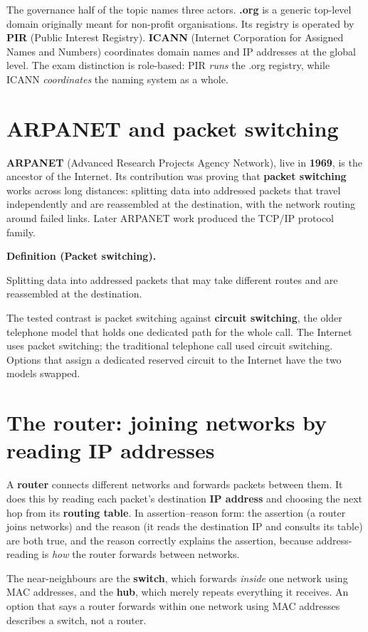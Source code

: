 \documentclass[11pt]{article}
\newenvironment{definitionbox}[1]{%
  \par\noindent\textbf{Definition (#1).}\ \itshape
}{\par\vspace{0.3em}}
\begin{document}
The governance half of the topic names three actors. \textbf{.org} is a
generic top-level domain originally meant for non-profit organisations.
Its registry is operated by \textbf{PIR} (Public Interest Registry).
\textbf{ICANN} (Internet Corporation for Assigned Names and Numbers)
coordinates domain names and IP addresses at the global level. The exam
distinction is role-based: PIR \emph{runs} the .org registry, while ICANN
\emph{coordinates} the naming system as a whole.

\section{ARPANET and packet switching}
\textbf{ARPANET} (Advanced Research Projects Agency Network), live in
\textbf{1969}, is the ancestor of the Internet. Its contribution was proving
that \textbf{packet switching} works across long distances: splitting data
into addressed packets that travel independently and are reassembled at the
destination, with the network routing around failed links. Later ARPANET work
produced the TCP/IP protocol family.

\begin{definitionbox}{Packet switching}
Splitting data into addressed packets that may take different routes and are
reassembled at the destination.
\end{definitionbox}

The tested contrast is packet switching against \textbf{circuit switching},
the older telephone model that holds one dedicated path for the whole call.
The Internet uses packet switching; the traditional telephone call used
circuit switching. Options that assign a dedicated reserved circuit to the
Internet have the two models swapped.

\section{The router: joining networks by reading IP addresses}
A \textbf{router} connects different networks and forwards packets between
them. It does this by reading each packet's destination \textbf{IP address}
and choosing the next hop from its \textbf{routing table}. In
assertion--reason form: the assertion (a router joins networks) and the
reason (it reads the destination IP and consults its table) are both true,
and the reason correctly explains the assertion, because address-reading is
\emph{how} the router forwards between networks.

The near-neighbours are the \textbf{switch}, which forwards \emph{inside} one
network using MAC addresses, and the \textbf{hub}, which merely repeats
everything it receives. An option that says a router forwards within one
network using MAC addresses describes a switch, not a router.
\end{document}
